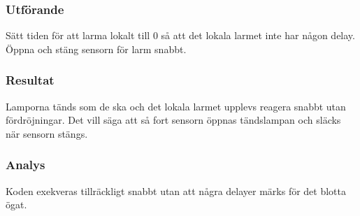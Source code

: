 \subsubsection*{Utförande}
Sätt tiden för att larma lokalt till 0 så att det lokala larmet inte har någon delay. Öppna och stäng
sensorn för larm snabbt.


\subsubsection*{Resultat}
Lamporna tänds som de ska och det lokala larmet upplevs reagera snabbt utan fördröjningar. 
Det vill säga att så fort sensorn öppnas tändslampan och släcks när sensorn stängs.



\subsubsection*{Analys}
Koden exekveras tillräckligt snabbt utan att några delayer märks för det blotta ögat.


